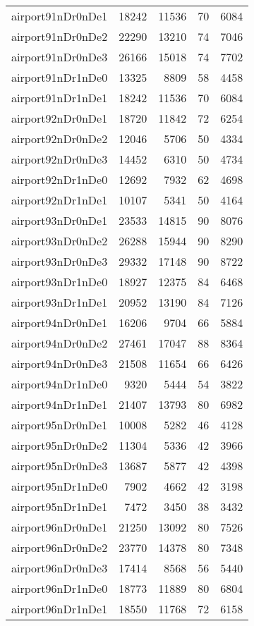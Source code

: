\begin{longtable}{lrrrr}
airport91nDr0nDe1 & 18242 & 11536 & 70 & 6084 \\
airport91nDr0nDe2 & 22290 & 13210 & 74 & 7046 \\
airport91nDr0nDe3 & 26166 & 15018 & 74 & 7702 \\
airport91nDr1nDe0 & 13325 & 8809 & 58 & 4458 \\
airport91nDr1nDe1 & 18242 & 11536 & 70 & 6084 \\
airport92nDr0nDe1 & 18720 & 11842 & 72 & 6254 \\
airport92nDr0nDe2 & 12046 & 5706 & 50 & 4334 \\
airport92nDr0nDe3 & 14452 & 6310 & 50 & 4734 \\
airport92nDr1nDe0 & 12692 & 7932 & 62 & 4698 \\
airport92nDr1nDe1 & 10107 & 5341 & 50 & 4164 \\
airport93nDr0nDe1 & 23533 & 14815 & 90 & 8076 \\
airport93nDr0nDe2 & 26288 & 15944 & 90 & 8290 \\
airport93nDr0nDe3 & 29332 & 17148 & 90 & 8722 \\
airport93nDr1nDe0 & 18927 & 12375 & 84 & 6468 \\
airport93nDr1nDe1 & 20952 & 13190 & 84 & 7126 \\
airport94nDr0nDe1 & 16206 & 9704 & 66 & 5884 \\
airport94nDr0nDe2 & 27461 & 17047 & 88 & 8364 \\
airport94nDr0nDe3 & 21508 & 11654 & 66 & 6426 \\
airport94nDr1nDe0 & 9320 & 5444 & 54 & 3822 \\
airport94nDr1nDe1 & 21407 & 13793 & 80 & 6982 \\
airport95nDr0nDe1 & 10008 & 5282 & 46 & 4128 \\
airport95nDr0nDe2 & 11304 & 5336 & 42 & 3966 \\
airport95nDr0nDe3 & 13687 & 5877 & 42 & 4398 \\
airport95nDr1nDe0 & 7902 & 4662 & 42 & 3198 \\
airport95nDr1nDe1 & 7472 & 3450 & 38 & 3432 \\
airport96nDr0nDe1 & 21250 & 13092 & 80 & 7526 \\
airport96nDr0nDe2 & 23770 & 14378 & 80 & 7348 \\
airport96nDr0nDe3 & 17414 & 8568 & 56 & 5440 \\
airport96nDr1nDe0 & 18773 & 11889 & 80 & 6804 \\
airport96nDr1nDe1 & 18550 & 11768 & 72 & 6158 \\

\end{longtable}
